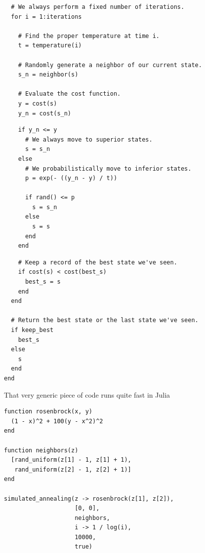 \documentclass{beamer}
\begin{document}
\begin{frame}[fragile]
	\begin{verbatim}
  # We always perform a fixed number of iterations.
  for i = 1:iterations
  
    # Find the proper temperature at time i.
    t = temperature(i)
    
    # Randomly generate a neighbor of our current state.
    s_n = neighbor(s)
    
    # Evaluate the cost function.
    y = cost(s)
    y_n = cost(s_n)
    	\end{verbatim}
\end{frame}

\begin{frame}[fragile]
	\begin{verbatim}    
    if y_n <= y
      # We always move to superior states.
      s = s_n
    else
      # We probabilistically move to inferior states.
      p = exp(- ((y_n - y) / t))
            
      if rand() <= p
        s = s_n
      else
        s = s
      end
    end
    	\end{verbatim}
\end{frame}

\begin{frame}[fragile]
	\begin{verbatim}    
    # Keep a record of the best state we've seen.
    if cost(s) < cost(best_s)
      best_s = s
    end
  end
  
  # Return the best state or the last state we've seen.
  if keep_best
    best_s
  else
    s
  end
end
	\end{verbatim}
\end{frame}

\frame
{
	\begin{center}
		That very generic piece of code runs quite fast in Julia
	\end{center}
}

\begin{frame}[fragile]
	\begin{verbatim}
function rosenbrock(x, y)
  (1 - x)^2 + 100(y - x^2)^2
end
 
function neighbors(z)
  [rand_uniform(z[1] - 1, z[1] + 1),
   rand_uniform(z[2] - 1, z[2] + 1)]
end
 
simulated_annealing(z -> rosenbrock(z[1], z[2]),
                    [0, 0],
                    neighbors,
                    i -> 1 / log(i),
                    10000,
                    true)
	\end{verbatim}
\end{frame}
\end{document}

